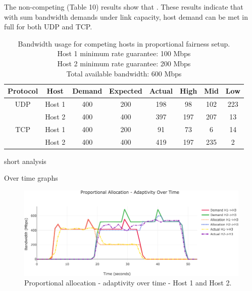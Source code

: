 \documentclass[accepted,single]{gipaper}
\begin{document}
The non-competing (Table 10) results show that . These results indicate that with sum bandwidth demands under link capacity, host demand can be met in full for both UDP and TCP.

\begin{table}[h]
	\label{prop_c}
	\vspace{-2mm}
	\begin{center}
		\begin{small}
		\setlength\tabcolsep{1.5pt}
			\begin{tabular}{cccccccc}
				Protocol & Host & Demand & Expected & Actual & High & Mid & Low\\
				\hline
				UDP & Host 1 & 400 & 200 & 198 & 98 & 102 & 223\\
				    & Host 2 & 400 & 400 & 397 & 197 & 207 & 13\\
				\hline
				TCP & Host 1 & 400 & 200 & 91 & 73 & 6 & 14\\
				    & Host 2 & 400 & 400 & 419 & 197 & 235 & 2\\
			\end{tabular}
		\end{small}
	\end{center}
	\caption{Bandwidth usage for competing hosts in proportional fairness setup.\\
	Host 1 minimum rate guarantee: 100 Mbps\\
	Host 2 minimum rate guarantee: 200 Mbps\\	
	Total available bandwidth: 600 Mbps}
	\vspace{-3mm}
\end{table}

short analysis

Over time graphs

\begin{figure}
	\centering
	\includegraphics[width=6in]{figs/dbap_ot_udp_both.png}
	\caption{ Proportional allocation - adaptivity over time - Host 1 and Host 2. } \label{dbap_ot_both}
\end{figure}
\end{document}
